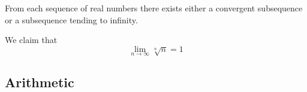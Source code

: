     \begin{corollary}
      \label{existence}
      From each sequence of real numbers there exists either a convergent subsequence or a subsequence tending to infinity. 
    \end{corollary}

    \begin{example}
      We claim that
      \begin{equation}
        \lim_{n\rightarrow \infty} \sqrt[n]{n} = 1
      \end{equation}
    \end{example}

\subsection{Arithmetic}

